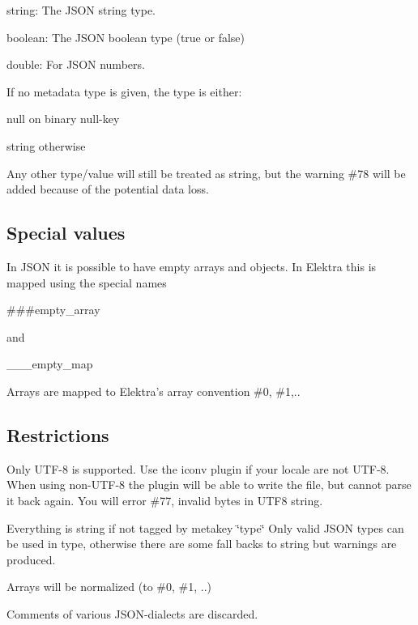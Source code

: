 \begin{DoxyItemize}
\item {\ttfamily string}\+: The J\+S\+ON string type.
\item {\ttfamily boolean}\+: The J\+S\+ON boolean type (true or false)
\item {\ttfamily double}\+: For J\+S\+ON numbers.
\end{DoxyItemize}

If no metadata {\ttfamily type} is given, the type is either\+:


\begin{DoxyItemize}
\item {\ttfamily null} on binary null-\/key
\item {\ttfamily string} otherwise
\end{DoxyItemize}

Any other type/value will still be treated as string, but the warning {\ttfamily \#78} will be added because of the potential data loss.

\subsection*{Special values}

In J\+S\+ON it is possible to have empty arrays and objects. In Elektra this is mapped using the special names \begin{DoxyVerb}###empty_array
\end{DoxyVerb}


and \begin{DoxyVerb}___empty_map
\end{DoxyVerb}


Arrays are mapped to Elektra’s array convention \#0, \#1,..

\subsection*{Restrictions}


\begin{DoxyItemize}
\item Only U\+T\+F-\/8 is supported. Use the {\ttfamily iconv} plugin if your locale are not U\+T\+F-\/8. When using non-\/\+U\+T\+F-\/8 the plugin will be able to write the file, but cannot parse it back again. You will error \#77, invalid bytes in U\+T\+F8 string.
\item Everything is string if not tagged by metakey \char`\"{}type\char`\"{} Only valid J\+S\+ON types can be used in type, otherwise there are some fall backs to string but warnings are produced.
\item Arrays will be normalized (to \#0, \#1, ..)
\item Comments of various J\+S\+O\+N-\/dialects are discarded.
\end{DoxyItemize}

